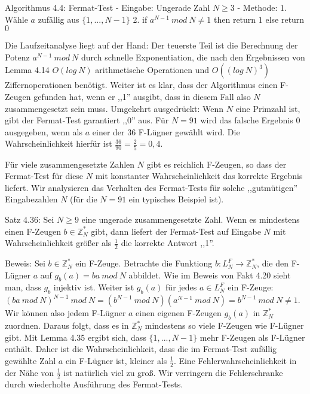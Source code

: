 \documentclass[a4paper]{article}
\begin{document}
\begin{multicols}{3}
    Algorithmus 4.4: Fermat-Test
    - Eingabe: Ungerade Zahl $N\geq 3$
    - Methode:
    1. Wähle $a$ zufällig aus $\{1,...,N-1\}$
    2. if $a^{N-1}\ mod\ N\not= 1$ then return $1$ else return $0$

    Die Laufzeitanalyse liegt auf der Hand: Der teuerste Teil ist die Berechnung der Potenz $a^{N-1}\ mod\ N$ durch schnelle Exponentiation, die nach den Ergebnissen von Lemma 4.14 $O(log\ N)$ arithmetische Operationen und $O((log\ N)^3)$ Ziffernoperationen benötigt. Weiter ist es klar, dass der Algorithmus einen F-Zeugen gefunden hat, wenn er ,,1'' ausgibt, dass in diesem Fall also $N$ zusammengesetzt sein muss. Umgekehrt ausgedrückt: Wenn $N$ eine Primzahl ist, gibt der Fermat-Test garantiert ,,0'' aus. Für $N=91$ wird das falsche Ergebnis $0$ ausgegeben, wenn als $a$ einer der 36 F-Lügner gewählt wird. Die Wahrscheinlichkeit hierfür ist $\frac{36}{90} =\frac{2}{5} = 0,4$.

    Für viele zusammengesetzte Zahlen $N$ gibt es reichlich F-Zeugen, so dass der Fermat-Test für diese $N$ mit konstanter Wahrscheinlichkeit das korrekte Ergebnis liefert. Wir analysieren das Verhalten des Fermat-Tests für solche ,,gutmütigen'' Eingabezahlen $N$ (für die $N=91$ ein typisches Beispiel ist).

    Satz 4.36: Sei $N\geq 9$ eine ungerade zusammengesetzte Zahl. Wenn es mindestens einen F-Zeugen $b\in\mathbb{Z}^*_N$ gibt, dann liefert der Fermat-Test auf Eingabe $N$ mit Wahrscheinlichkeit größer als $\frac{1}{2}$ die korrekte Antwort ,,1''.

    Beweis: Sei $b\in\mathbb{Z}^*_N$ ein F-Zeuge. Betrachte die Funktiong $b:L^F_N\rightarrow\mathbb{Z}^*_N$, die den F-Lügner $a$ auf $g_b(a) =ba\ mod\ N$ abbildet. Wie im Beweis von Fakt 4.20 sieht man, dass $g_b$ injektiv ist. Weiter ist $g_b(a)$ für jedes $a\in L^F_N$ ein F-Zeuge: $(ba\ mod\ N)^{N-1}\ mod\ N= (b^{N-1}\ mod\ N)(a^{N-1}\ mod\ N) =b^{N-1}\ mod\ N\not= 1$.
    Wir können also jedem F-Lügner $a$ einen eigenen F-Zeugen $g_b(a)$ in $\mathbb{Z}^*_N$ zuordnen. Daraus folgt, dass es in $\mathbb{Z}^*_N$ mindestens so viele F-Zeugen wie F-Lügner gibt. Mit Lemma 4.35 ergibt sich, dass $\{1,...,N-1\}$ mehr F-Zeugen als F-Lügner enthält. Daher ist die Wahrscheinlichkeit, dass die im Fermat-Test zufällig gewählte Zahl $a$ ein F-Lügner ist, kleiner als $\frac{1}{2}$.
    Eine Fehlerwahrscheinlichkeit in der Nähe von $\frac{1}{2}$ ist natürlich viel zu groß. Wir verringern die Fehlerschranke durch wiederholte Ausführung des Fermat-Tests.


\end{multicols}
\end{document}
